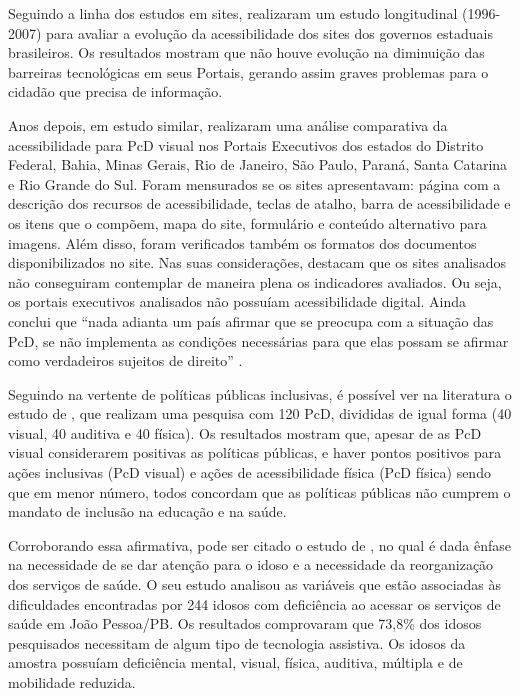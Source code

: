 \documentclass{textolivre}
\begin{document}
Seguindo a linha dos estudos em sites, \textcite{freire2009} realizaram um estudo longitudinal (1996-2007) para avaliar a evolução da acessibilidade dos sites dos governos estaduais brasileiros. Os resultados mostram que não houve evolução na diminuição das barreiras tecnológicas em seus Portais, gerando assim graves problemas para o cidadão que precisa de informação.

Anos depois, em estudo similar, \textcite{silva2015} realizaram uma análise comparativa da acessibilidade para PcD visual nos Portais Executivos dos estados do Distrito Federal, Bahia, Minas Gerais, Rio de Janeiro, São Paulo, Paraná, Santa Catarina e Rio Grande do Sul. Foram mensurados se os sites apresentavam: página com a descrição dos recursos de acessibilidade, teclas de atalho, barra de acessibilidade e os itens que o compõem, mapa do site, formulário e conteúdo alternativo para imagens. Além disso, foram verificados também os formatos dos documentos disponibilizados no site. Nas suas considerações, destacam que os sites analisados não conseguiram contemplar de maneira plena os indicadores avaliados. Ou seja, os portais executivos analisados não possuíam acessibilidade digital. Ainda conclui que “nada adianta um país afirmar que se preocupa com a situação das PcD, se não implementa as condições necessárias para que elas possam se afirmar como verdadeiros sujeitos de direito” \cite[p. 334]{silva2015}.

Seguindo na vertente de políticas públicas inclusivas, é possível ver na literatura o estudo de \textcite{pagliuca2015}, que realizam uma pesquisa com 120 PcD, divididas de igual forma (40 visual, 40 auditiva e 40 física). Os resultados mostram que, apesar de as PcD visual considerarem positivas as políticas públicas, e haver pontos positivos para ações inclusivas (PcD visual) e ações de acessibilidade física (PcD física) sendo que em menor número, todos concordam que as políticas públicas não cumprem o mandato de inclusão na educação e na saúde.

Corroborando essa afirmativa, pode ser citado o estudo de \textcite{amaral2012}, no qual é dada ênfase na necessidade de se dar atenção para o idoso e a necessidade da reorganização dos serviços de saúde. O seu estudo analisou as variáveis que estão associadas às dificuldades encontradas por 244 idosos com deficiência ao acessar os serviços de saúde em João Pessoa/PB. Os resultados comprovaram que 73,8\% dos idosos pesquisados necessitam de algum tipo de tecnologia assistiva. Os idosos da amostra possuíam deficiência mental, visual, física, auditiva, múltipla e de mobilidade reduzida.
\end{document}
